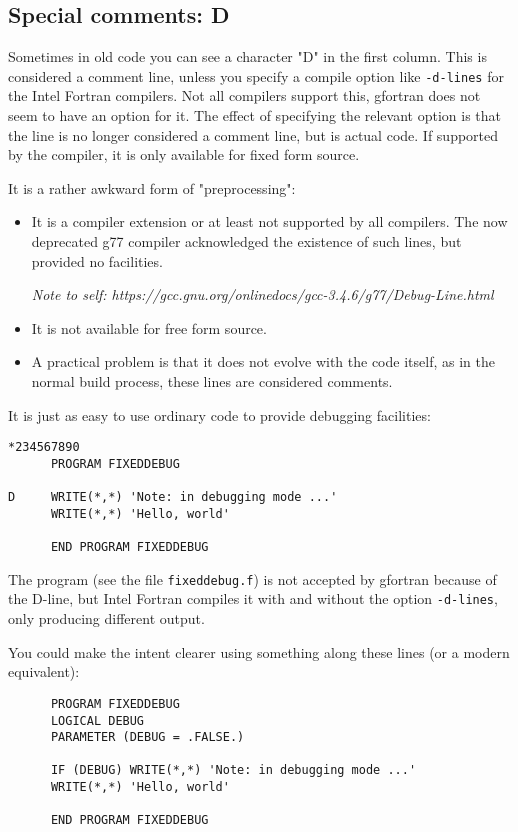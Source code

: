 \subsection{Special comments: D}
Sometimes in old code you can see a character "D" in the first column. This is considered a comment line,
unless you specify a compile option like \verb+-d-lines+ for the Intel Fortran compilers. Not all compilers
support this, gfortran does not seem to have an option for it. The effect of specifying the relevant
option is that the line is no longer considered a comment line, but is actual code. If supported by the compiler,
it is only available for fixed form source.

It is a rather awkward form of "preprocessing":
\begin{itemize}
\item
It is a compiler extension or at least not supported by all compilers. The now deprecated g77 compiler acknowledged
the existence of such lines, but provided no facilities.

\emph{Note to self: https://gcc.gnu.org/onlinedocs/gcc-3.4.6/g77/Debug-Line.html
}
\item
It is not available for free form source.
\item
A practical problem is that it does not evolve with the code itself, as in the normal build process, these
lines are considered comments.
\end{itemize}

It is just as easy to use ordinary code to provide debugging facilities:
\begin{verbatim}
*234567890
      PROGRAM FIXEDDEBUG

D     WRITE(*,*) 'Note: in debugging mode ...'
      WRITE(*,*) 'Hello, world'

      END PROGRAM FIXEDDEBUG
\end{verbatim}

The program (see the file \verb+fixeddebug.f+) is not accepted by gfortran because of the D-line, but Intel Fortran
compiles it with and without the option \verb+-d-lines+, only producing different output.

You could make the intent clearer using something along these lines (or a modern equivalent):
\begin{verbatim}
      PROGRAM FIXEDDEBUG
      LOGICAL DEBUG
      PARAMETER (DEBUG = .FALSE.)

      IF (DEBUG) WRITE(*,*) 'Note: in debugging mode ...'
      WRITE(*,*) 'Hello, world'

      END PROGRAM FIXEDDEBUG
\end{verbatim}

